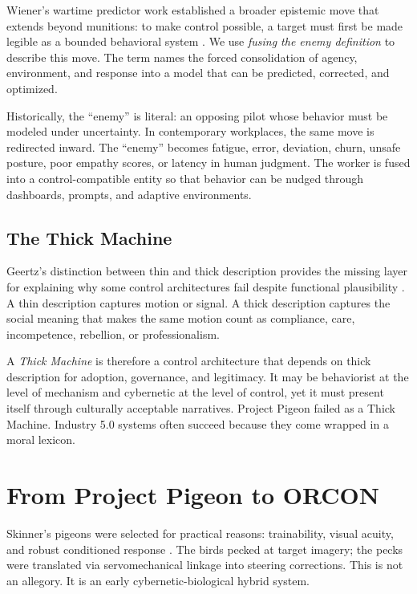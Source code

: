 \documentclass[runningheads]{llncs}
\begin{document}
Wiener's wartime predictor work established a broader epistemic move that extends beyond munitions: to make control possible, a target must first be made legible as a bounded behavioral system \cite{wiener1948cybernetics}. We use \emph{fusing the enemy definition} to describe this move. The term names the forced consolidation of agency, environment, and response into a model that can be predicted, corrected, and optimized.

Historically, the ``enemy'' is literal: an opposing pilot whose behavior must be modeled under uncertainty. In contemporary workplaces, the same move is redirected inward. The ``enemy'' becomes fatigue, error, deviation, churn, unsafe posture, poor empathy scores, or latency in human judgment. The worker is fused into a control-compatible entity so that behavior can be nudged through dashboards, prompts, and adaptive environments.

\subsection{The Thick Machine}

Geertz's distinction between thin and thick description provides the missing layer for explaining why some control architectures fail despite functional plausibility \cite{geertz1973interpretation}. A thin description captures motion or signal. A thick description captures the social meaning that makes the same motion count as compliance, care, incompetence, rebellion, or professionalism.

A \emph{Thick Machine} is therefore a control architecture that depends on thick description for adoption, governance, and legitimacy. It may be behaviorist at the level of mechanism and cybernetic at the level of control, yet it must present itself through culturally acceptable narratives. Project Pigeon failed as a Thick Machine. Industry 5.0 systems often succeed because they come wrapped in a moral lexicon.

\section{From Project Pigeon to ORCON}

Skinner's pigeons were selected for practical reasons: trainability, visual acuity, and robust conditioned response \cite{skinner1960pigeons}. The birds pecked at target imagery; the pecks were translated via servomechanical linkage into steering corrections. This is not an allegory. It is an early cybernetic-biological hybrid system.
\end{document}
